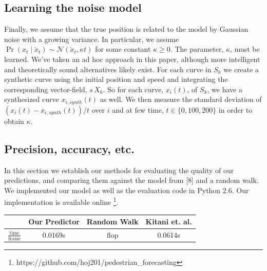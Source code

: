 \documentclass[conference]{IEEEtran}
\begin{document}
  \subsection{Learning the noise model}
  Finally, we assume that the true position is related to the model by Gaussian noise with a growing variance.
  In particular, we assume $\Pr( x_t \mid \check{x}_t) \sim \mathcal{N}( \check{x}_t , \kappa t)$ for some constant $\kappa \geq 0$.
  The parameter, $\kappa$, must be learned.
  We've taken an ad hoc approach in this paper, although more intelligent and theoretically sound alternatives likely exist.
  For each curve in $S_k$ we create a synthetic curve using the initial position and speed and integrating the corresponding vector-field, $s\, X_k$.
  So for each curve, $x_i(t)$, of $S_k$, we have a synthesized curve $x_{i,synth}(t)$ as well.
  We then measure the standard deviation of $(x_i(t) - x_{i,synth}(t)) / t$ over $i$ and at few time, $t \in \{ 0, 100, 200 \}$ in order to obtain $\kappa$.
  
 \subsection{ Precision, accuracy, etc.}
In this section we establish our methods for evaluating the quality of our predictions, and comparing them against the model from [8] and a random walk.
We implemented our model as well as the evaluation code in Python 2.6. Our implementation is available online \footnote{https://github.com/hoj201/pedestrian\_forecasting}.
\begin{tabular}{||c | c c  c ||} 
	\hline
	& Our Predictor & Random Walk & Kitani et. al. \\ [0.5ex] 
	\hline 
	$\frac{\mathrm{time}}{\mathrm{frame}}$ & 0.0169s & flop & 0.0614s \\
	\hline
	
\end{tabular}
\end{document}
